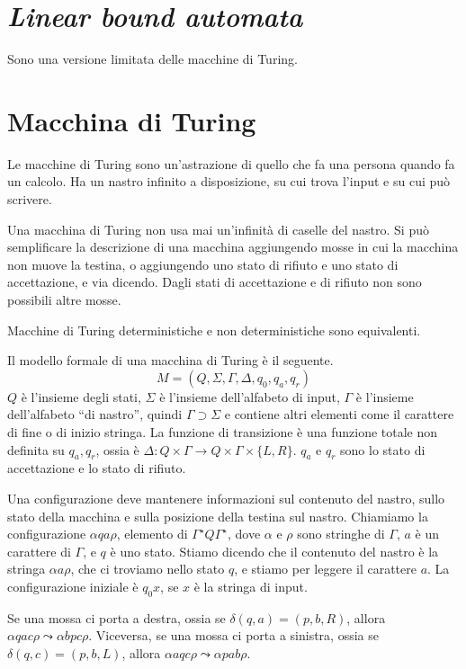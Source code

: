 \section{\emph{Linear bound automata}}

Sono una versione limitata delle macchine di Turing.


\section{Macchina di Turing}

Le macchine di Turing sono un'astrazione di quello che fa una persona quando fa un calcolo.
Ha un nastro infinito a disposizione, su cui trova l'input e su cui pu\`o scrivere.

Una macchina di Turing non usa mai un'infinit\`a di caselle del nastro.
Si pu\`o semplificare la descrizione di una macchina aggiungendo mosse in cui la macchina non muove la testina, o aggiungendo uno stato di rifiuto e uno stato di accettazione, e via dicendo.
Dagli stati di accettazione e di rifiuto non sono possibili altre mosse.

Macchine di Turing deterministiche e non deterministiche sono equivalenti.

Il modello formale di una macchina di Turing \`e il seguente.
\[
	M = (Q, \Sigma, \Gamma, \Delta, q_0, q_a, q_r)
\]
$Q$ \`e l'insieme degli stati, $\Sigma$ \`e l'insieme dell'alfabeto di input, $\Gamma$ \`e l'insieme dell'alfabeto ``di nastro'', quindi $\Gamma \supset \Sigma$ e contiene altri elementi come il carattere di fine o di inizio stringa.
La funzione di transizione \`e una funzione totale non definita su $q_a, q_r$, ossia \`e $\Delta : Q \times \Gamma \to Q \times \Gamma \times \{L, R\}$.
$q_a$ e $q_r$ sono lo stato di accettazione e lo stato di rifiuto.

Una configurazione deve mantenere informazioni sul contenuto del nastro, sullo stato della macchina e sulla posizione della testina sul nastro.
Chiamiamo la configurazione $\alpha q a \rho$, elemento di $\Gamma^{\star} Q \Gamma^{\star}$, dove $\alpha$ e $\rho$ sono stringhe di $\Gamma$, $a$ \`e un carattere di $\Gamma$, e $q$ \`e uno stato.
Stiamo dicendo che il contenuto del nastro \`e la stringa $\alpha a \rho$, che ci troviamo nello stato $q$, e stiamo per leggere il carattere $a$.
La configurazione iniziale \`e $q_0 x$, se $x$ \`e la stringa di input.

Se una mossa ci porta a destra, ossia se $\delta(q, a) = (p, b, R)$, allora $\alpha q a c \rho \leadsto \alpha b p c \rho$.
Viceversa, se una mossa ci porta a sinistra, ossia se $\delta(q,c) = (p,b,L)$, allora $\alpha a q c \rho \leadsto \alpha p a b \rho$.

